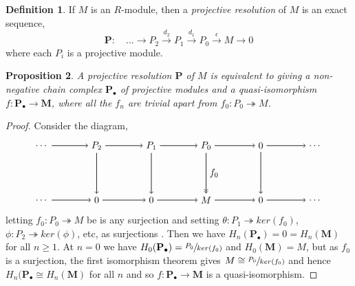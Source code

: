 \documentclass[11.5pt, twoside, a4paper, titlepage]{report}
\theoremstyle{definition}
\newtheorem{mydef}{Definition}[section]
\theoremstyle{plain}
\newtheorem{prop}[mydef]{Proposition}
\begin{document}
\begin{mydef}
If $M$ is an $R$-module, then a \emph{projective resolution} of $M$ is an exact sequence, 
\begin{equation*}
\mathbf{P}: \quad \dots \xrightarrow{} P_2 \xrightarrow{d_2} P_1 \xrightarrow{d_1} P_0 \xrightarrow{\epsilon} M \xrightarrow{} 0
\end{equation*}
where each $P_i$ is a projective module.
\end{mydef}

\begin{prop}
A projective resolution $\mathbf{P}$ of $M$ is equivalent to giving a non-negative chain complex $\mathbf{P}_{\bullet}$ of projective modules and a quasi-isomorphism $f: \mathbf{P}_{\bullet} \to \mathbf{M}$, where all the $f_n$ are trivial apart from $f_0: P_0 \twoheadrightarrow M$.
\end{prop}
\begin{proof}
Consider the diagram,
\begin{equation*}
\begin{tikzpicture}[->,-latex, auto, main path/.style={->, semithick}, main node/.style={}]
\node	[main node]		(2) at (2,0)		{$\dots$};
\node	[main node]		(3) at (4,0)		{$P_2$};
\node [main node]		(4) at (6,0)		{$P_1$};
\node [main node]		(5) at (8,0)		{$P_0$};
\node	[main node]		(11) at (10,0)	{$0$};
\node [main node] 		(12) at (12,0)	{$\dots$};

\node	[main node]		(7) at (2,-2)		{$\dots$};
\node	[main node]		(8) at (4,-2)		{$0$};
\node [main node]		(9) at (6,-2)		{$0$};
\node [main node]		(10) at (8,-2)	{$M$};
\node [main node]		(13) at (10,-2)	{$0$};
\node [main node]		(14) at (12, -2)	{$\dots$};

\draw (2) edge [main path] node [auto] {$$} (3);
\draw (3) edge [main path] node [auto] {$$} (4);
\draw (4) edge [main path] node [auto] {$$} (5);
\draw (5) edge [main path] (11);
\draw (11) edge [main path] (12);

\draw (7) edge [main path] node [auto] {$$} (8);
\path (8) edge [main path] node [auto] {$$} (9);
\draw (9) edge [main path] node [auto, swap] {$$} (10);
\draw (10) edge [main path] (13);
\draw (13) edge [main path] (14);

\draw (3) edge [main path] node [auto] {$$} (8);
\draw (4) edge [main path] node [auto] {$$} (9);
\draw (5) edge [->>, semithick] node [auto] {$f_0$} (10);
\draw (11) edge [main path] (13);
\end{tikzpicture}
\end{equation*}
letting $f_0: P_0 \twoheadrightarrow M$ be is any surjection and setting $\theta: P_1 \twoheadrightarrow ker(f_0)$, $\phi: P_2 \twoheadrightarrow ker(\phi)$, etc, as surjections . Then we have $H_n(\mathbf{P}_{\bullet})=0=H_n(\mathbf{M})$ for all $n\geq 1$. At $n=0$ we have $H_0(\mathbf{P}_{\bullet})=\sfrac{P_0}{ker(f_0)}$ and $H_0(\mathbf{M})=M$, but as $f_0$ is a surjection, the first isomorphism theorem gives $M\cong \sfrac{P_0}{ker(f_0)}$ and hence $H_n(\mathbf{P}_{\bullet} \cong H_n(\mathbf{M})$ for all $n$ and so $f: \mathbf{P}_{\bullet} \to \mathbf{M}$ is a quasi-isomorphism.
\end{proof}
\end{document}
